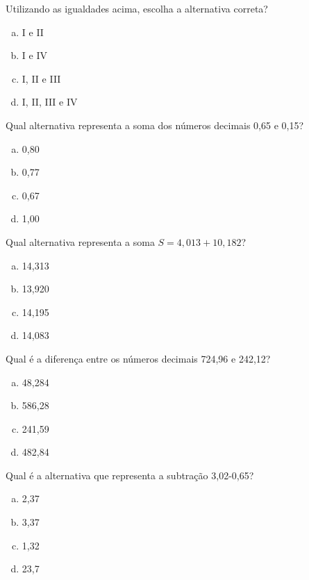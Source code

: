 Utilizando as igualdades acima, escolha a alternativa correta?
\begin{multicols}{4}
\begin{enumerate}[a)]
	\item I e II
	\item I e IV
	\item I, II e III
	\item I, II, III e IV
\end{enumerate}
\end{multicols}

\item Qual alternativa representa a soma dos números decimais 0,65 e 0,15?
\begin{multicols}{4}
\begin{enumerate}[a)]
	\item 0,80
	\item 0,77
	\item 0,67
	\item 1,00
\end{enumerate}
\end{multicols}

\item Qual alternativa representa a soma $S=4,013+10,182$?
\begin{multicols}{4}
\begin{enumerate}[a)]
	\item 14,313
	\item 13,920
	\item 14,195
	\item 14,083
\end{enumerate}
\end{multicols}

\item Qual é a diferença entre os números decimais 724,96 e 242,12?
\begin{multicols}{4}
\begin{enumerate}[a)]
	\item 48,284
	\item 586,28
	\item 241,59
	\item 482,84
\end{enumerate}
\end{multicols}

\item Qual é a alternativa que representa a subtração 3,02-0,65?
\begin{multicols}{4}
\begin{enumerate}[a)]
	\item 2,37
	\item 3,37
	\item 1,32
	\item 23,7
\end{enumerate}
\end{multicols}

